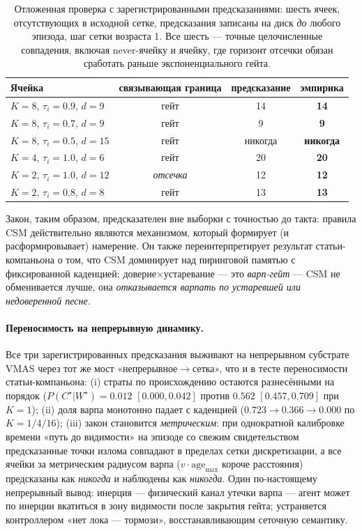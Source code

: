 \documentclass{article}
\newcommand{\wstar}{W^{\star}}
\newcommand{\cstar}{C^{\star}}
\begin{document}
\begin{table}[h]
\centering
\caption{Отложенная проверка с зарегистрированными предсказаниями:
шесть ячеек, отсутствующих в исходной сетке, предсказания записаны на
диск \emph{до} любого эпизода, шаг сетки возраста 1. Все шесть ---
точные целочисленные совпадения, включая never-ячейку и ячейку, где
горизонт отсечки обязан сработать раньше экспоненциального гейта.}
\label{tab:holdout}
\small
\begin{tabular}{lccc}
\toprule
Ячейка & связывающая граница & предсказание & эмпирика \\
\midrule
$K{=}8$, $\tau_i{=}0.9$, $d{=}9$  & гейт    & 14 & \textbf{14} \\
$K{=}8$, $\tau_i{=}0.7$, $d{=}9$  & гейт    & 9  & \textbf{9}  \\
$K{=}8$, $\tau_i{=}0.5$, $d{=}15$ & гейт    & никогда & \textbf{никогда} \\
$K{=}4$, $\tau_i{=}1.0$, $d{=}6$  & гейт    & 20 & \textbf{20} \\
$K{=}2$, $\tau_i{=}1.0$, $d{=}12$ & \emph{отсечка} & 12 & \textbf{12} \\
$K{=}2$, $\tau_i{=}0.8$, $d{=}8$  & гейт    & 13 & \textbf{13} \\
\bottomrule
\end{tabular}
\end{table}

Закон, таким образом, предсказателен вне выборки с точностью до
такта: правила CSM действительно являются механизмом, который
формирует (и расформировывает) намерение. Он также переинтерпретирует
результат статьи-компаньона о том, что CSM доминирует над пиринговой
памятью с фиксированной каденцией: доверие$\times$устаревание --- это
\emph{варп-гейт} --- CSM не обменивается лучше, она \emph{отказывается
варпать по устаревшей или недоверенной песне}.

\paragraph{Переносимость на непрерывную динамику.} Все три
зарегистрированных предсказания выживают на непрерывном субстрате
VMAS через тот же мост «непрерывное$\to$сетка», что и в тесте
переносимости статьи-компаньона: (i) страты по происхождению остаются
разнесёнными на порядок ($P(\cstar|\wstar)=0.012$ $[0.000,0.042]$
против $0.562$ $[0.457,0.709]$ при $K{=}1$); (ii) доля варпа
монотонно падает с каденцией ($0.723\to0.366\to0.000$ по $K{=}1/4/16$);
(iii) закон становится \emph{метрическим}: при однократной калибровке
времени «путь до видимости» на эпизоде со свежим свидетельством
предсказанные точки излома совпадают в пределах сетки дискретизации,
а все ячейки за метрическим радиусом варпа
($v\cdot\mathrm{age}_{\max}$ короче расстояния) предсказаны как
\emph{никогда} и наблюдены как \emph{никогда}. Один по-настоящему
непрерывный вывод: инерция --- физический канал утечки варпа --- агент
может по инерции вкатиться в зону видимости после закрытия гейта;
устраняется контроллером «нет лока --- тормози», восстанавливающим
сеточную семантику.
\end{document}

